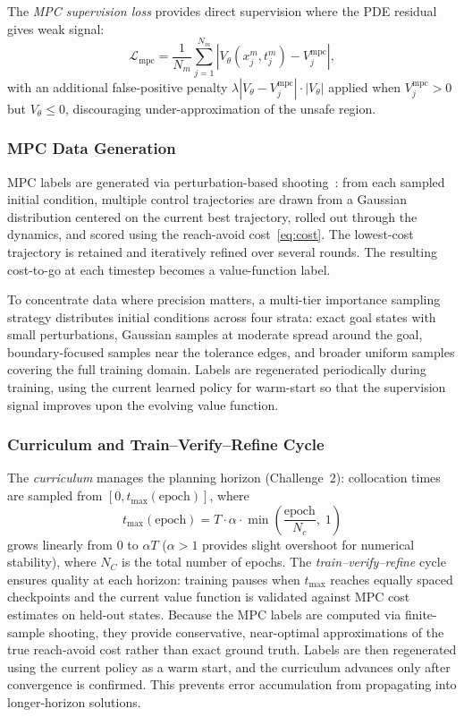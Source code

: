 \documentclass[letterpaper, 10 pt, conference]{ieeeconf}
\begin{document}
The \emph{MPC supervision loss} provides direct supervision where the PDE residual gives weak signal:
\begin{equation}\label{eq:mpc_loss}
\mathcal{L}_{\mathrm{mpc}} = \frac{1}{N_m}\sum_{j=1}^{N_m} |V_\theta(x_j^m, t_j^m) - V_j^{\mathrm{mpc}}|,
\end{equation}
with an additional false-positive penalty $\lambda |V_\theta - V_j^{\mathrm{mpc}}| \cdot |V_\theta|$ applied when $V_j^{\mathrm{mpc}} > 0$ but $V_\theta \leq 0$, discouraging under-approximation of the unsafe region.

\subsubsection{MPC Data Generation}\label{sec:mpc_data}

MPC labels are generated via perturbation-based shooting~\cite{MPCDeepReach}: from each sampled initial condition, multiple control trajectories are drawn from a Gaussian distribution centered on the current best trajectory, rolled out through the dynamics, and scored using the reach-avoid cost~\eqref{eq:cost}. The lowest-cost trajectory is retained and iteratively refined over several rounds. The resulting cost-to-go at each timestep becomes a value-function label.

To concentrate data where precision matters, a multi-tier importance sampling strategy distributes initial conditions across four strata: exact goal states with small perturbations, Gaussian samples at moderate spread around the goal, boundary-focused samples near the tolerance edges, and broader uniform samples covering the full training domain. Labels are regenerated periodically during training, using the current learned policy for warm-start so that the supervision signal improves upon the evolving value function.

\subsubsection{Curriculum and Train--Verify--Refine Cycle}\label{sec:curriculum}

The \emph{curriculum} manages the planning horizon (Challenge~2): collocation times are sampled from $[0, t_{\max}(\text{epoch})]$, where
\begin{equation}\label{eq:curriculum}
t_{\max}(\text{epoch}) = T \cdot \alpha \cdot \min\!\left(\frac{\text{epoch}}{N_c},\; 1\right)
\end{equation}
grows linearly from $0$ to $\alpha T$ ($\alpha > 1$ provides slight overshoot for numerical stability), where $N_C$ is the total number of epochs. The \emph{train--verify--refine} cycle ensures quality at each horizon: training pauses when $t_{\max}$ reaches equally spaced checkpoints and the current value function is validated against MPC cost estimates on held-out states. Because the MPC labels are computed via finite-sample shooting, they provide conservative, near-optimal approximations of the true reach-avoid cost rather than exact ground truth. Labels are then regenerated using the current policy as a warm start, and the curriculum advances only after convergence is confirmed. This prevents error accumulation from propagating into longer-horizon solutions.
\end{document}
